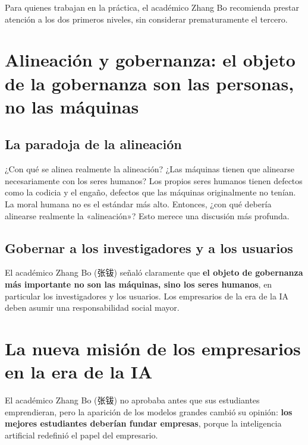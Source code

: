 \documentclass[a4paper]{article}
\begin{document}
Para quienes trabajan en la práctica, el académico Zhang Bo recomienda prestar atención a los dos primeros niveles, sin considerar prematuramente el tercero.


\section{Alineación y gobernanza: el objeto de la gobernanza son las personas, no las máquinas}

\subsection{La paradoja de la alineación}

\begin{warningbox}{¿Con qué se alinea realmente la alineación?}
¿Las máquinas tienen que alinearse necesariamente con los seres humanos? Los propios seres humanos tienen defectos como la codicia y el engaño, defectos que las máquinas originalmente no tenían. La moral humana no es el estándar más alto. Entonces, ¿con qué debería alinearse realmente la «alineación»? Esto merece una discusión más profunda.
\end{warningbox}

\subsection{Gobernar a los investigadores y a los usuarios}

El académico Zhang Bo (张钹) señaló claramente que \textbf{el objeto de gobernanza más importante no son las máquinas, sino los seres humanos}, en particular los investigadores y los usuarios. Los empresarios de la era de la IA deben asumir una responsabilidad social mayor.

\section{La nueva misión de los empresarios en la era de la IA}

El académico Zhang Bo (张钹) no aprobaba antes que sus estudiantes emprendieran, pero la aparición de los modelos grandes cambió su opinión: \textbf{los mejores estudiantes deberían fundar empresas}, porque la inteligencia artificial redefinió el papel del empresario.
\end{document}
